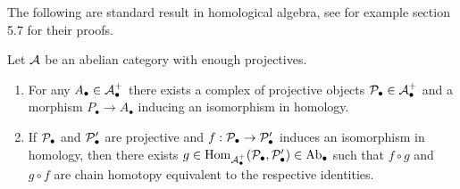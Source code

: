 \documentclass[main.tex]{subfiles}
\begin{document}
The following are standard result in homological algebra, see for example \cite{Wei95} section 5.7 for their proofs.
\begin{lemma} \label{Projective resolutions and weak => strong for projectives}
Let $\A$ be an abelian category with enough projectives.
\begin{enumerate}
\item For any $A_\bullet\in\A_\bullet^+$ there exists a complex of projective objects $\P_\bullet\in\A^+_\bullet$ and a morphism $P_\bullet\to A_\bullet$ inducing an isomorphism in homology.
\item If $\P_\bullet$ and $\P'_\bullet$ are projective and $f:\P_\bullet\to\P'_\bullet$ induces an isomorphism in homology, then there exists $g\in\Hom_{\A_{\bullet}^+}(\P_\bullet,\P'_\bullet)\in\Ab_{\bullet}$ such that $f\circ g$ and $g\circ f$ are chain homotopy equivalent to the respective identities.
\end{enumerate}
\end{lemma}
\end{document}
